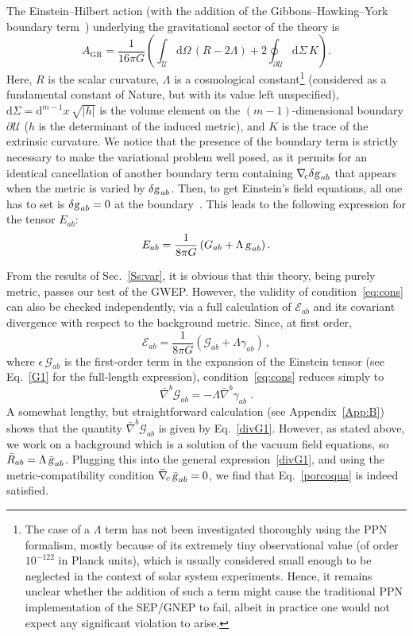 \documentclass[a4paper,showkeys,aps,prd,reprint,nofootinbib,showpacs,twocolumn]{revtex4-1}
\newcommand{\pd}{\partial}
\newcommand{\de}{\mathrm{d}}
\newcommand{\ton}[1]{\left(#1\right)}
\newcommand{\abs}[1]{\left\vert#1\right\vert}
\newcommand{\eq}[1]{\( #1 \)}
\newcommand{\eqd}[1]{\begin{equation} #1 \end{equation}}
\newcommand{\Cal}[1]{\mathcal{#1}}
\newcommand{\Scr}[1]{\mathscr{#1}}
\newcommand{\matg}{\text{\textsl{g}}}%
\theoremstyle{plain}
\begin{document}
The Einstein--Hilbert action (with the addition of the Gibbons--Hawking--York boundary term~\cite{York:1972sj, Gibbons:1976ue, Dyer:2008hb}) underlying the gravitational sector of the theory is
%
\eqd{A_{\text{GR}} = \frac{1}{16\pi G} \ton{\int_{\Scr{U}} \!\! \de \Omega \, \ton{R  - 2 \Lambda} + 2 \oint_{\pd \Scr{U}} \!\!\! \de \Sigma \, K} . \label{eq:einhilact}}
%
Here, \eq{R} is the scalar curvature, \eq{\Lambda} is a cosmological constant\footnote{The case of a \eq{\Lambda} term has not been investigated thoroughly using the PPN formalism, mostly because of its extremely tiny observational value (of order \eq{10^{-122}} in Planck units), which is usually considered small enough to be neglected in the context of solar system experiments.  Hence, it remains unclear whether the addition of such a term might cause the traditional PPN implementation of the SEP/GNEP to fail, albeit in practice one would not expect any significant violation to arise.} (considered as a fundamental constant of Nature, but with its value left unspecified), \eq{\de \Sigma = \de^{m-1} x \, \sqrt{\abs{h}}} is the volume element on the \eq{\ton{m-1}}-dimensional boundary \eq{\pd \Scr{U}} (\eq{h} is the determinant of the induced metric), and \eq{K} is the trace of the extrinsic curvature.  We notice that the presence of the boundary term is strictly necessary to make the variational problem well posed, as it permits for an identical cancellation of another boundary term containing \eq{\nabla_{\! c} \delta\matg_{ab}} that appears when the metric is varied by \eq{\delta \matg_{ab}}.  Then, to get Einstein's field equations, all one has to set is \eq{\delta \matg_{ab} = 0} at the boundary~\cite{Wald:1984rg, Dyer:2008hb}.  This leads to the following expression for the tensor \eq{E_{ab}}:
%
\eqd{E_{ab}=\frac{1}{8 \pi G} \ton{G_{ab} + \Lambda \, \matg_{ab}}.}
%

From the results of Sec.~\ref{Ss:var}, it is obvious that this theory, being purely metric, passes our test of the GWEP.  However, the validity of condition~\eqref{eq:cons} can also be checked independently, via a full calculation of \eq{\Cal{E}_{ab}} and its covariant divergence with respect to the background metric.  Since, at first order,
%
\eqd{\Cal{E}_{ab} = \frac{1}{8 \pi G} \ton{\Cal{G}_{ab} + \Lambda \gamma_{ab}} \,, \label{eq:cosmoconst}}
%
where \eq{\epsilon \, \Cal{G}_{ab}} is the first-order term in the expansion of the Einstein tensor (see Eq.~\eqref{G1} for the full-length expression), condition~\eqref{eq:cons} reduces simply to 
%
\eqd{\bar{\nabla}^b \Cal{G}_{ab} = - \Lambda \bar{\nabla}^b \gamma_{ab} 
\label{porcoqua}\;.}
%
A somewhat lengthy, but straightforward calculation (see Appendix~\ref{App:B}) shows that the quantity \eq{\bar{\nabla}^b \Cal{G}_{ab}} is given by Eq.~\eqref{divG1}.  However, as stated above, we work on a background which is a solution of the vacuum field equations, so \eq{\bar{R}_{ab} = \Lambda \, \bar{\matg}_{ab}}.  Plugging this into the general expression~\eqref{divG1}, and using the metric-compatibility condition \eq{\bar{\nabla}_{\! c} \, \bar{\matg}_{ab} = 0}, we find that Eq.~\eqref{porcoqua} is indeed satisfied.
\end{document}
